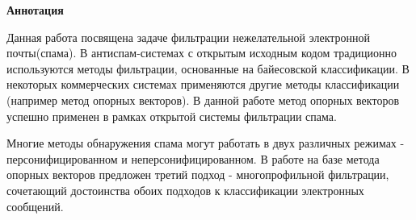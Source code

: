 \newpage
\textbf{Аннотация}

Данная работа посвящена задаче фильтрации нежелательной электронной почты(спама). В антиспам-системах с открытым исходным кодом традиционно используются методы фильтрации, основанные на байесовской классификации. В некоторых коммерческих системах применяются другие методы классификации (например метод опорных векторов). В данной работе метод опорных векторов успешно применен в рамках открытой системы фильтрации спама.

Многие методы обнаружения спама могут работать в двух различных режимах - персонифицированном и неперсонифицированном. В работе на базе метода опорных векторов предложен третий подход - многопрофильной фильтрации, сочетающий достоинства обоих подходов к классификации электронных сообщений.
